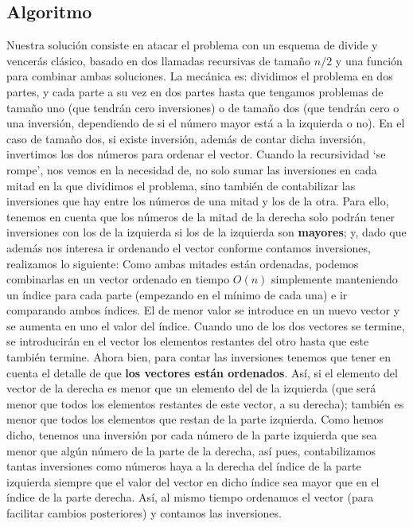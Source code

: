\documentclass[a4paper, 11pt]{article}
\begin{document}
\subsection{Algoritmo}
	
	Nuestra solución consiste en atacar el problema con un esquema de divide y vencerás clásico, basado en dos llamadas recursivas de tamaño $n/2$ y una función para combinar ambas soluciones. La mecánica es: dividimos el problema en dos partes, y cada parte a su vez en dos partes hasta que tengamos problemas de tamaño uno (que tendrán cero inversiones) o de tamaño dos (que tendrán cero o una inversión, dependiendo de si el número mayor está a la izquierda o no). En el caso de tamaño dos, si existe inversión, además de contar dicha inversión, invertimos los dos números para ordenar el vector. 
	Cuando la recursividad `se rompe', nos vemos en la necesidad de, no solo sumar las inversiones en cada mitad en la que dividimos el problema, sino también de contabilizar las inversiones que hay entre los números de una mitad y los de la otra.
	Para ello, tenemos en cuenta que los números de la mitad de la derecha solo podrán tener inversiones con los de la izquierda si los de la izquierda son \textbf{mayores}; y, dado que además nos interesa ir ordenando el vector conforme contamos inversiones, realizamos lo siguiente:
	Como ambas mitades están ordenadas, podemos combinarlas en un vector ordenado en tiempo $O(n)$ simplemente manteniendo un índice para cada parte (empezando en el mínimo de cada una) e ir comparando ambos índices. El de menor valor se introduce en un nuevo vector y se aumenta en uno el valor del índice. Cuando uno de los dos vectores se termine, se introducirán en el vector los elementos restantes del otro hasta que este también termine. Ahora bien, para contar las inversiones tenemos que tener en cuenta el detalle de que \textbf{los vectores están ordenados}. Así, si el elemento del vector de la derecha es menor que un elemento del de la izquierda (que será menor que todos los elementos restantes de este vector, a su derecha); también es menor que todos los elementos que restan de la parte izquierda. Como hemos dicho, tenemos una inversión por cada número de la parte izquierda que sea menor que algún número de la parte de la derecha, así pues, contabilizamos tantas inversiones como números haya a la derecha del índice de la parte izquierda siempre que el valor del vector en dicho índice sea mayor que en el índice de la parte derecha. Así, al mismo tiempo ordenamos el vector (para facilitar cambios posteriores) y contamos las inversiones.
\end{document}
